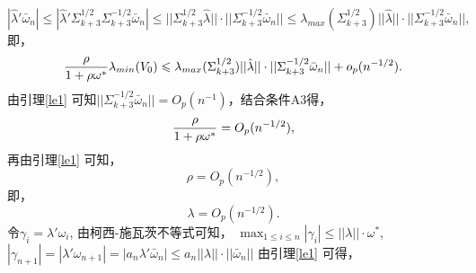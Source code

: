 \documentclass[a4paper,c5size,onecolumn,twoside,cap,Chinese]{APSart}
\begin{document}
 $$
 |\hat{\lambda}'\bar{\omega}_n| \le |\hat{\lambda}'\Sigma_{k+3}^{1/2}\Sigma_{k+3}^{-1/2}\bar{\omega}_n| \le  ||\Sigma_{k+3}^{1/2}\hat{\lambda}|| \cdot ||\Sigma_{k+3}^{-1/2}\bar{\omega}_n|| \le  \lambda_{max} ( \Sigma_{k+3}^{1/2})||\hat{\lambda}|| \cdot ||\Sigma_{k+3}^{-1/2}\bar{\omega}_n||   ,$$
即，
 $${\rho\over 1+\rho\omega^*}\lambda_{min} (V_0) \le  \lambda_{max} ( \Sigma_{k+3}^{1/2})||\hat{\lambda}|| \cdot ||\Sigma_{k+3}^{-1/2}\bar{\omega}_n||+o_p(n^{-1/2}).$$
 由引理\ref{le1} 可知$||\Sigma_{k+3}^{-1/2}\bar{\omega}_n||=O_p(n^{-1})$，结合条件A3得，
$${\rho\over 1+\rho\omega^*}= O_p(n^{-1/2}),$$
再由引理\ref{le1} 可知，
$${\rho}= O_p(n^{-1/2}),$$
即，
\begin{equation}
\lambda= O_p(n^{-1/2}) .\label{lam}
\end{equation}
令$\gamma_i=\lambda'\omega_i$, 由柯西-施瓦茨不等式可知，
$\max_{ 1\leq i\leq n}|  \gamma_i | \le  ||\lambda || \cdot \omega^*  $, \ $|  \gamma_{n+1} | =  |\lambda' \omega_{n+1} |=|a_n \lambda' \bar{\omega}_{n} |\le  a_n||\lambda || \cdot  ||\bar{\omega}_{n}||$
由引理\ref{le1} 可得，
\end{document}
